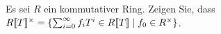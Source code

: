 %       
% 
% 
%       
%       


\begin{question}[subtitle = Die Einheitengruppe des Potenzreihenrings]
  Es sei $R$ ein kommutativer Ring.
  Zeigen Sie, dass $R[\![T]\!]^\times = \{\sum_{i=0}^\infty f_i T^i \in R[\![T]\!] \mid f_0 \in R^\times\}$.
\end{question}


